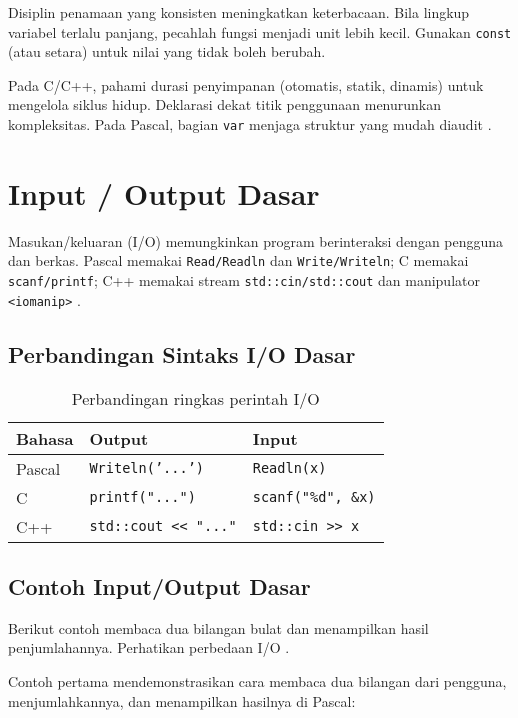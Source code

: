 \documentclass[../main.tex]{subfiles}
\begin{document}
Disiplin penamaan yang konsisten meningkatkan keterbacaan. Bila lingkup variabel terlalu panjang, pecahlah fungsi menjadi unit lebih kecil. Gunakan \texttt{const} (atau setara) untuk nilai yang tidak boleh berubah.

Pada C/C++, pahami durasi penyimpanan (otomatis, statik, dinamis) untuk mengelola siklus hidup. Deklarasi dekat titik penggunaan menurunkan kompleksitas. Pada Pascal, bagian \texttt{var} menjaga struktur yang mudah diaudit \parencite{free-pascal-docs,gnu-c-manual}.

\section{Input / Output Dasar}
Masukan/keluaran (I/O) memungkinkan program berinteraksi dengan pengguna dan berkas. Pascal memakai \texttt{Read/Readln} dan \texttt{Write/Writeln}; C memakai \texttt{scanf/printf}; C++ memakai stream \texttt{std::cin/std::cout} dan manipulator \texttt{<iomanip>} \parencite{w3pascal-io,gnu-c-manual,cplusplus-io,cpp-iomanip}.

\subsection{Perbandingan Sintaks I/O Dasar}
\begin{table}[H]
  \centering
  \caption{Perbandingan ringkas perintah I/O}
  \label{tab:io-basic}
  \begin{tabular}{@{}lll@{}}
    \toprule
    Bahasa & Output & Input \\
    \midrule
    Pascal & \texttt{Writeln('...')} & \texttt{Readln(x)} \\
    C      & \texttt{printf("...")} & \texttt{scanf("\%d", \&x)} \\
    C++    & \texttt{std::cout << "..."} & \texttt{std::cin >> x} \\
    \bottomrule
  \end{tabular}
\end{table}

\subsection{Contoh Input/Output Dasar}
Berikut contoh membaca dua bilangan bulat dan menampilkan hasil penjumlahannya. Perhatikan perbedaan I/O \parencite{w3pascal-io,gnu-c-manual,cpp-reference}.

Contoh pertama mendemonstrasikan cara membaca dua bilangan dari pengguna, menjumlahkannya, dan menampilkan hasilnya di Pascal:
\end{document}

